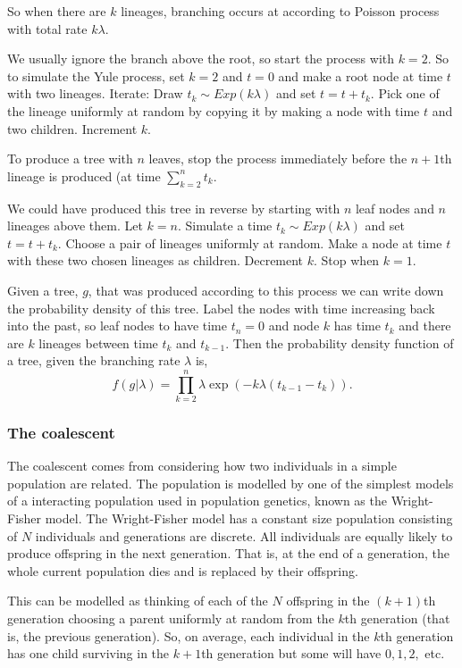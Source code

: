 \documentclass[11pt]{article}
\begin{document}
So when there are $k$ lineages, branching occurs at according to Poisson process with total rate $k\lambda$.  

We usually ignore the branch above the root, so start the process with $k=2$.  So to simulate the Yule process, set $k=2$ and $t= 0$ and make a root node at time $t$ with two lineages. Iterate:  Draw $t_k \sim Exp(k\lambda)$ and set $t = t+t_k$.  Pick one of the lineage uniformly at random by copying it by making a node with time $t $ and two children. Increment $k$.  

To produce a tree with $n$ leaves, stop the process immediately before the $n+1$th lineage is produced (at time $\sum_{k = 2}^n t_k$.  

We could have produced this tree in reverse by starting with $n$ leaf nodes and $n$ lineages above them. Let $k = n$. Simulate a time $t_k \sim Exp(k\lambda)$ and set $t= t+t_k$. Choose a pair of lineages uniformly at random.  Make a node at time $t$ with these two chosen lineages as children.  Decrement $k$. Stop when $k=1$.

Given a tree, $g$, that was produced according to this process we can write down the probability density of this tree. Label the nodes with time increasing back into the past, so leaf nodes to have time $t_n = 0$ and node $k$ has time $t_k$ and there are $k$ lineages between time $t_k$  and $t_{k-1}$.  Then the probability density function of a tree, given the branching rate $\lambda$ is, 
\[ f(g|\lambda)  = \prod_{k=2}^n  \lambda \exp\left(-k\lambda (t_{k-1} -t_k)\right).  \]

\subsubsection{The coalescent}
 
 The coalescent comes from considering how two individuals in a simple population are related.  The population is modelled by one of the simplest models of a interacting population used in population genetics, known as the Wright-Fisher model.  The Wright-Fisher model has a constant size population consisting of $N$ individuals and generations are discrete.  All individuals are equally likely to produce offspring in the next generation.  That is, at the end of a generation, the whole current population dies and is replaced by their offspring.
 
 This can be modelled as thinking of each of the $N$ offspring in the $(k+1)$th generation choosing a parent uniformly at random from the $k$th generation (that is, the previous generation).  So, on average, each individual in the $k$th generation has one child surviving in the $k+1$th generation but some will have $0, 1, 2,$ etc. 
 
\end{document}
